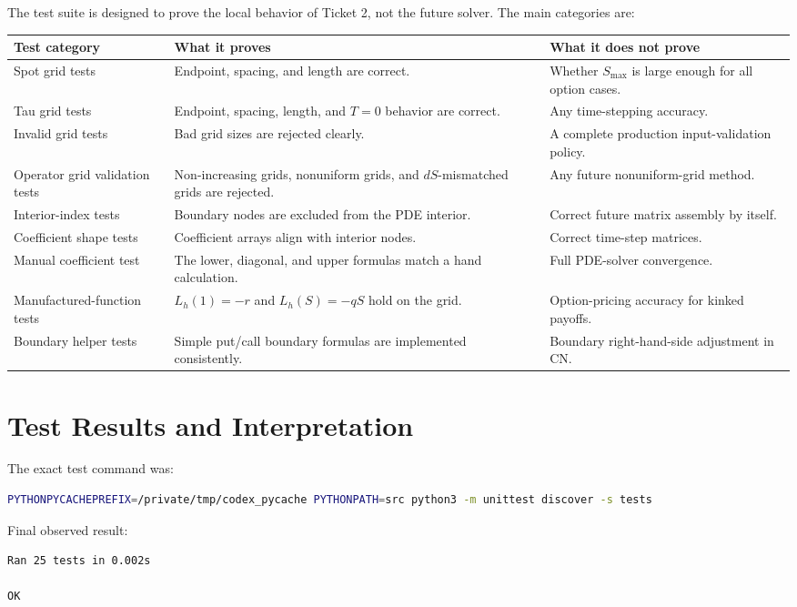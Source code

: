 \documentclass[11pt,a4paper]{article}
\begin{document}
The test suite is designed to prove the local behavior of Ticket 2, not the future solver. The
main categories are:
\begin{longtable}{L{0.25\textwidth}L{0.31\textwidth}L{0.32\textwidth}}
\toprule
Test category & What it proves & What it does not prove \\
\midrule
\endhead
Spot grid tests &
Endpoint, spacing, and length are correct. &
Whether \(S_{\max}\) is large enough for all option cases. \\
Tau grid tests &
Endpoint, spacing, length, and \(T=0\) behavior are correct. &
Any time-stepping accuracy. \\
Invalid grid tests &
Bad grid sizes are rejected clearly. &
A complete production input-validation policy. \\
Operator grid validation tests &
Non-increasing grids, nonuniform grids, and \(dS\)-mismatched grids are rejected. &
Any future nonuniform-grid method. \\
Interior-index tests &
Boundary nodes are excluded from the PDE interior. &
Correct future matrix assembly by itself. \\
Coefficient shape tests &
Coefficient arrays align with interior nodes. &
Correct time-step matrices. \\
Manual coefficient test &
The lower, diagonal, and upper formulas match a hand calculation. &
Full PDE-solver convergence. \\
Manufactured-function tests &
\(L_h(1)=-r\) and \(L_h(S)=-qS\) hold on the grid. &
Option-pricing accuracy for kinked payoffs. \\
Boundary helper tests &
Simple put/call boundary formulas are implemented consistently. &
Boundary right-hand-side adjustment in CN. \\
\bottomrule
\end{longtable}

\section{Test Results and Interpretation}

The exact test command was:
\begin{lstlisting}[language=bash]
PYTHONPYCACHEPREFIX=/private/tmp/codex_pycache PYTHONPATH=src python3 -m unittest discover -s tests
\end{lstlisting}

Final observed result:
\begin{lstlisting}
Ran 25 tests in 0.002s

OK
\end{lstlisting}
\end{document}
